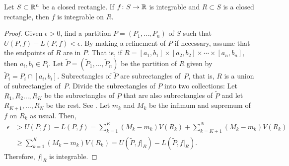 \begin{prop} \label{mv:prop:integralsmallerset}
Let $S \subset {\mathbb{R}}^n$ be a closed rectangle.
If $f \colon S \to {\mathbb{R}}$ is integrable and $R \subset S$
is a closed rectangle, then $f$ is integrable on $R$.
\end{prop}

\begin{proof}
Given $\epsilon > 0$, find a partition $P=(P_1,\ldots,P_n)$
of $S$ such that
$U(P,f)-L(P,f) < \epsilon$.  By making a refinement of $P$
if necessary,
assume that the endpoints of $R$ are in $P$.  That is,
if $R = [a_1,b_1] \times [a_2,b_2] \times \cdots \times [a_n,b_n]$,
then $a_i,b_i \in P_i$.
Let $\widetilde{P} = (\widetilde{P}_1,\ldots,\widetilde{P}_n)$
be the partition of $R$ given by $\widetilde{P}_i = P_i \cap [a_i,b_i]$.
Subrectangles of $\widetilde{P}$ are subrectangles of~$P$, that
is, $R$ is a union of subrectangles of~$P$.
Divide the subrectangles of $P$ into two collections:
Let $R_1,R_2\ldots,R_K$ be the subrectangles of $P$ that are
also subrectangles of $\widetilde{P}$ and
let $R_{K+1},\ldots, R_N$ be the rest.
See .
Let $m_k$ and $M_k$ be the infimum and supremum
of $f$ on $R_k$ as usual.  Then,
\begin{equation*}
\begin{split}
\epsilon & > 
U(P,f)-L(P,f)
=
\sum_{k=1}^K (M_k-m_k) V(R_k)
+
\sum_{k=K+1}^N (M_k-m_k) V(R_k)
\\
&
\geq
\sum_{k=1}^K (M_k-m_k) V(R_k)
=
U(\widetilde{P},f|_R)-L(\widetilde{P},f|_R) .
\end{split}
\end{equation*}
Therefore, $f|_R$ is integrable.
\end{proof}
\begin{myfigureht}
\caption{A partition of a large rectangle $S$, that also gives a partition
of a smaller rectangle (shaded and outlined) $R \subset S$.
The subrectangles $R_1,R_2,R_3,R_4$ are the subrectangles of
$\widetilde{P} = \bigl( \{ x_{1,1}, x_{1,2} , x_{1,3} \} ,
\{ x_{2,1}, x_{2,2} , x_{2,3} \} \bigr)$.\label{fig:figrectsubrect}}
\end{myfigureht}

